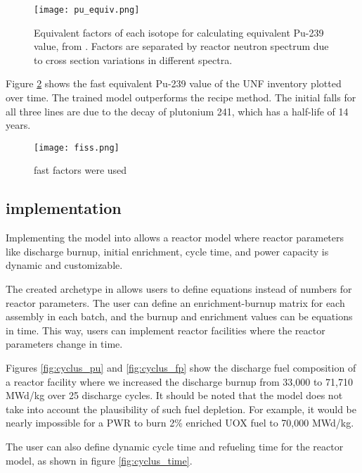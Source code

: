 \begin{figure}
    \centering
    \texttt{[image: pu\_equiv.png]}
    \caption{Equivalent factors of each isotope for
             calculating equivalent Pu-239 value,
             from \cite{anon_plutonium_1989}. Factors
             are separated by reactor neutron spectrum
             due to cross section variations in different
             spectra.}
    \label{fig:pu_equiv}
\end{figure}

Figure \ref{fig:fiss} shows the fast equivalent Pu-239
value of the \gls{UNF} inventory plotted over time.
The trained model outperforms the recipe method. The
initial falls for all three lines are due to the
decay of plutonium 241, which has a half-life of
14 years.

\begin{figure}
    \centering
    \texttt{[image: fiss.png]}
    \caption{fast factors were used}
    \label{fig:fiss}
\end{figure}




\subsection{\Cyclus implementation}

Implementing the model into \Cyclus allows a 
reactor model where reactor parameters like discharge
burnup, initial enrichment, cycle time, and power
capacity is dynamic and customizable.

The created archetype in \Cyclus allows users to define
equations instead of numbers for reactor parameters.
The user can define an enrichment-burnup matrix for
each assembly in each batch, and the burnup and enrichment
values can be equations in time. This way, users can
implement reactor facilities where the reactor parameters
change in time.

Figures \ref{fig:cyclus_pu}
and \ref{fig:cyclus_fp} show the discharge fuel composition
of a reactor facility where we increased the discharge burnup
from 33,000 to 71,710 MWd/kg over 25 discharge cycles.
It should be noted that the model does not take into account
the plausibility of such fuel depletion. For example, it
would be nearly impossible for a  \gls{PWR} to burn 2\%
enriched \gls{UOX} fuel to 70,000 MWd/kg.

The user can also define dynamic
cycle time and refueling time for the reactor model, as shown
in figure \ref{fig:cyclus_time}.



